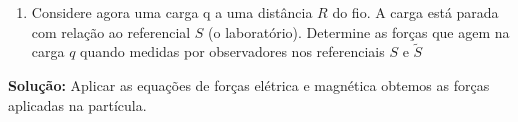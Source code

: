 \documentclass[10pt,a4paper]{article}
\begin{document}
\begin{enumerate}
\begin{enumerate}
		\item Considere agora uma carga q a uma distância $R$ do fio. A carga está parada com relação ao referencial $S$ (o laboratório). Determine as forças que agem na carga $q$ quando medidas por observadores nos referenciais $S$ e $\tilde{S}$
	\end{enumerate}
	\textbf{Solução: }
	Aplicar as equações de forças elétrica e magnética obtemos as forças aplicadas na partícula.
\end{enumerate}
\end{document}
